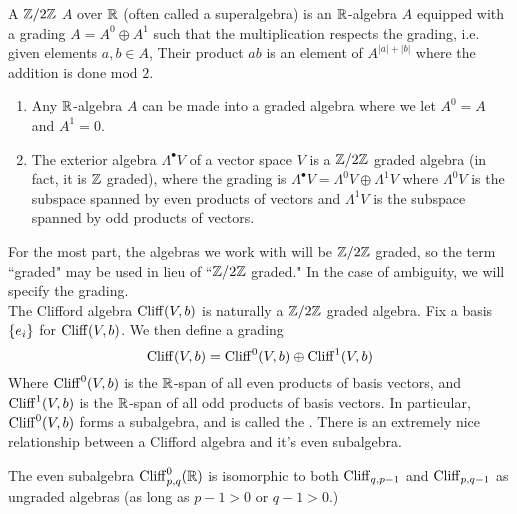 %
\begin{defn}
A $\mathbb{Z}/2\mathbb{Z}$  $A$ over $\mathbb{R}$ (often called a superalgebra) is
an $\mathbb{R}$-algebra $A$ equipped with a grading $A = A^0 \oplus A^1$ such that
the multiplication respects the grading, i.e. given elements $a,b \in A$, Their
product $ab$ is an element of $A^{|a| + |b|}$ where the addition is done mod $2$.
\end{defn}
%
\begin{exmp}\enumbreak
\begin{enumerate}
  \item Any $\mathbb{R}$-algebra $A$ can be made into a graded algebra where we let
  $A^0 = A$ and $A^1 = 0$.
  \item The exterior algebra $\Lambda^\bullet V$ of a vector space $V$ is
  a $\mathbb{Z}/2\mathbb{Z}$ graded algebra (in fact, it is $\mathbb{Z}$ graded), where the grading is
  $\Lambda^\bullet V = \Lambda^0 V \oplus \Lambda^1 V$ where $\Lambda^0 V$
  is the subspace spanned by even products of vectors and $\Lambda^1 V$ is the
  subspace spanned by odd products of vectors.
\end{enumerate}
\end{exmp}
%
For the most part, the algebras we work with will be $\mathbb{Z}/2\mathbb{Z}$ graded, so
the term ``graded" may be used in lieu of ``$\mathbb{Z}/2\mathbb{Z}$ graded." In the case of
ambiguity, we will specify the grading. \\
The Clifford algebra $\operatorname{Cliff}(V,b)$ is naturally a $\mathbb{Z}/2\mathbb{Z}$ graded algebra. Fix
a basis $\left\lbrace e_i \right\rbrace$ for $\operatorname{Cliff}(V,b)$. We then define a grading
\[
\operatorname{Cliff}(V,b) = \operatorname{Cliff}^0(V,b) \oplus \operatorname{Cliff}^1(V,b)
\]
Where $\operatorname{Cliff}^0(V,b)$ is the $\mathbb{R}$-span of all even products of basis vectors,
and $\operatorname{Cliff}^1(V,b)$ is the $\mathbb{R}$-span of all odd products of basis vectors. In
particular, $\operatorname{Cliff}^0(V,b)$ forms a subalgebra, and is called the . There is an extremely nice relationship between a Clifford algebra
and it's even subalgebra.
%
\begin{thm}
The even subalgebra $\operatorname{Cliff}_{p,q}^0(\mathbb{R})$ is isomorphic to both $\operatorname{Cliff}_{q, p-1}$
and $\operatorname{Cliff}_{p,q-1}$ as ungraded algebras (as long as $p-1 > 0$ or $q-1 > 0$.)
\end{thm}
%
